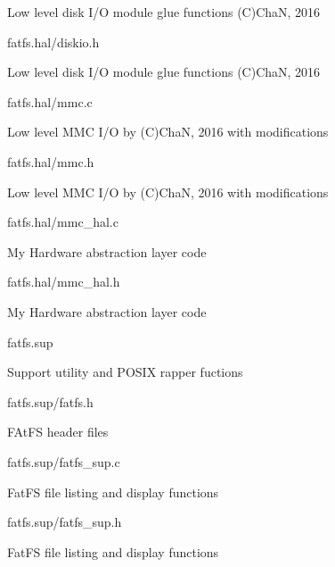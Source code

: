 \begin{DoxyItemize}
\begin{DoxyItemize}
\begin{DoxyItemize}
\item Low level disk I/O module glue functions (C)ChaN, 2016
\end{DoxyItemize}
\item fatfs.\+hal/diskio.h
\begin{DoxyItemize}
\item Low level disk I/O module glue functions (C)ChaN, 2016
\end{DoxyItemize}
\item fatfs.\+hal/mmc.c
\begin{DoxyItemize}
\item Low level M\+MC I/O by (C)ChaN, 2016 with modifications
\end{DoxyItemize}
\item fatfs.\+hal/mmc.h
\begin{DoxyItemize}
\item Low level M\+MC I/O by (C)ChaN, 2016 with modifications
\end{DoxyItemize}
\item fatfs.\+hal/mmc\+\_\+hal.c
\begin{DoxyItemize}
\item My Hardware abstraction layer code
\end{DoxyItemize}
\item fatfs.\+hal/mmc\+\_\+hal.h
\begin{DoxyItemize}
\item My Hardware abstraction layer code
\end{DoxyItemize}
\end{DoxyItemize}
\item fatfs.\+sup
\begin{DoxyItemize}
\item Support utility and P\+O\+S\+IX rapper fuctions
\item fatfs.\+sup/fatfs.h
\begin{DoxyItemize}
\item F\+At\+FS header files
\end{DoxyItemize}
\item fatfs.\+sup/fatfs\+\_\+sup.c
\begin{DoxyItemize}
\item Fat\+FS file listing and display functions
\end{DoxyItemize}
\item fatfs.\+sup/fatfs\+\_\+sup.h
\begin{DoxyItemize}
\item Fat\+FS file listing and display functions

\end{DoxyItemize}
\end{DoxyItemize}
\end{DoxyItemize}

